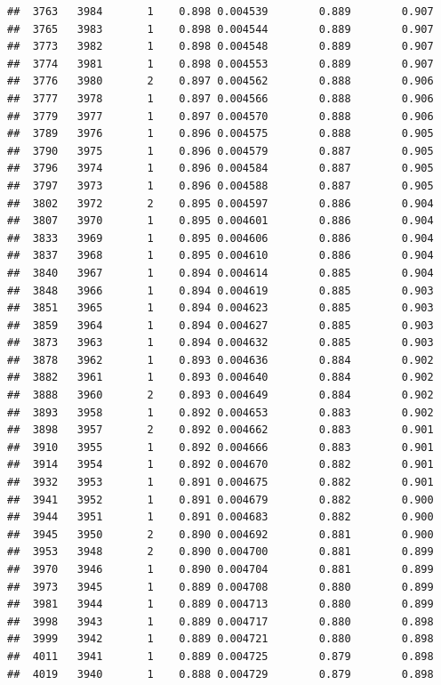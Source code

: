 \documentclass[
]{book}
\begin{document}
\begin{verbatim}
##  3763   3984       1    0.898 0.004539        0.889        0.907
##  3765   3983       1    0.898 0.004544        0.889        0.907
##  3773   3982       1    0.898 0.004548        0.889        0.907
##  3774   3981       1    0.898 0.004553        0.889        0.907
##  3776   3980       2    0.897 0.004562        0.888        0.906
##  3777   3978       1    0.897 0.004566        0.888        0.906
##  3779   3977       1    0.897 0.004570        0.888        0.906
##  3789   3976       1    0.896 0.004575        0.888        0.905
##  3790   3975       1    0.896 0.004579        0.887        0.905
##  3796   3974       1    0.896 0.004584        0.887        0.905
##  3797   3973       1    0.896 0.004588        0.887        0.905
##  3802   3972       2    0.895 0.004597        0.886        0.904
##  3807   3970       1    0.895 0.004601        0.886        0.904
##  3833   3969       1    0.895 0.004606        0.886        0.904
##  3837   3968       1    0.895 0.004610        0.886        0.904
##  3840   3967       1    0.894 0.004614        0.885        0.904
##  3848   3966       1    0.894 0.004619        0.885        0.903
##  3851   3965       1    0.894 0.004623        0.885        0.903
##  3859   3964       1    0.894 0.004627        0.885        0.903
##  3873   3963       1    0.894 0.004632        0.885        0.903
##  3878   3962       1    0.893 0.004636        0.884        0.902
##  3882   3961       1    0.893 0.004640        0.884        0.902
##  3888   3960       2    0.893 0.004649        0.884        0.902
##  3893   3958       1    0.892 0.004653        0.883        0.902
##  3898   3957       2    0.892 0.004662        0.883        0.901
##  3910   3955       1    0.892 0.004666        0.883        0.901
##  3914   3954       1    0.892 0.004670        0.882        0.901
##  3932   3953       1    0.891 0.004675        0.882        0.901
##  3941   3952       1    0.891 0.004679        0.882        0.900
##  3944   3951       1    0.891 0.004683        0.882        0.900
##  3945   3950       2    0.890 0.004692        0.881        0.900
##  3953   3948       2    0.890 0.004700        0.881        0.899
##  3970   3946       1    0.890 0.004704        0.881        0.899
##  3973   3945       1    0.889 0.004708        0.880        0.899
##  3981   3944       1    0.889 0.004713        0.880        0.899
##  3998   3943       1    0.889 0.004717        0.880        0.898
##  3999   3942       1    0.889 0.004721        0.880        0.898
##  4011   3941       1    0.889 0.004725        0.879        0.898
##  4019   3940       1    0.888 0.004729        0.879        0.898

\end{verbatim}
\end{document}
